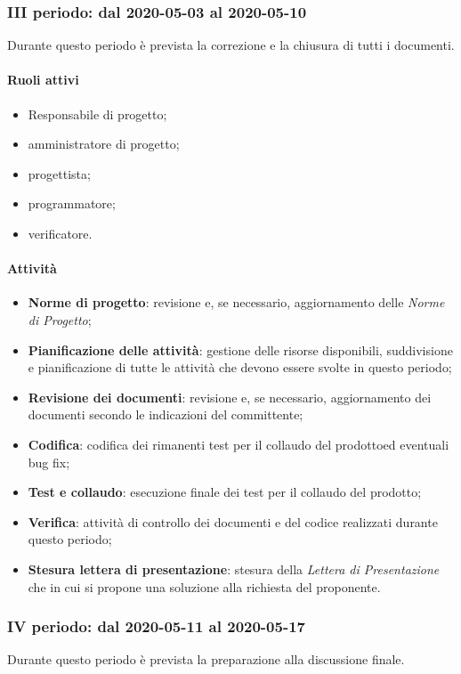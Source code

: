 \subsubsection{III periodo: dal 2020-05-03 al 2020-05-10}
Durante questo periodo è prevista la correzione e la chiusura di tutti i documenti.
\paragraph{Ruoli attivi}
\begin{itemize}
	\item Responsabile di progetto\glo;
	\item amministratore di progetto\glo;
	\item progettista;
	\item programmatore;
	\item verificatore.
\end{itemize}
\paragraph{Attività}
\begin{itemize}
	\item \textbf{Norme di progetto}: revisione e, se necessario, aggiornamento delle \textit{Norme di Progetto};
	\item \textbf{Pianificazione delle attività}: gestione delle risorse disponibili, suddivisione e pianificazione di tutte le attività che devono essere svolte in questo periodo;
	\item \textbf{Revisione dei documenti}: revisione e, se necessario, aggiornamento dei documenti secondo le indicazioni del committente;
	\item \textbf{Codifica}: codifica dei rimanenti test per il collaudo del prodotto\glosp ed eventuali bug fix;
	\item \textbf{Test e collaudo}: esecuzione finale dei test per il collaudo del prodotto\glo;
	\item \textbf{Verifica}: attività di controllo dei documenti e del codice realizzati durante questo periodo;
	\item \textbf{Stesura lettera di presentazione}: stesura della \textit{Lettera di Presentazione} che in cui si propone una soluzione alla richiesta del proponente.
\end{itemize}

\subsubsection{IV periodo: dal 2020-05-11 al 2020-05-17}
Durante questo periodo è prevista la preparazione alla discussione finale.
